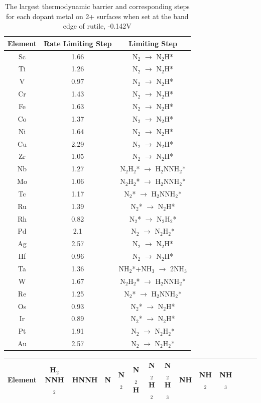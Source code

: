 \documentclass{article}
\begin{document}
\begin{table}
\begin{center}
\begin{tabular}{| c | c |c |}
\hline
Element & Rate Limiting Step & Limiting Step \\
\hline
Sc & 1.66 & N$_2$ $\rightarrow$ N$_2$H*\\
Ti & 1.26 & N$_2$ $\rightarrow$ N$_2$H*\\
V & 0.97 & N$_2$ $\rightarrow$ N$_2$H*\\
Cr & 1.43 & N$_2$ $\rightarrow$ N$_2$H*\\
Fe & 1.63 & N$_2$ $\rightarrow$ N$_2$H*\\
Co & 1.37 & N$_2$ $\rightarrow$ N$_2$H*\\
Ni & 1.64 & N$_2$ $\rightarrow$ N$_2$H*\\
Cu & 2.29 & N$_2$ $\rightarrow$ N$_2$H*\\
Zr & 1.05 & N$_2$ $\rightarrow$ N$_2$H*\\
Nb & 1.27 & N$_2$H$_2$* $\rightarrow$ H$_2$NNH$_2$*\\
Mo & 1.06 & N$_2$H$_2$* $\rightarrow$ H$_2$NNH$_2$*\\
Tc & 1.17 & N$_2$* $\rightarrow$ H$_2$NNH$_2$*\\
Ru & 1.39 & N$_2$* $\rightarrow$ N$_2$H*\\
Rh & 0.82 & N$_2$* $\rightarrow$ N$_2$H$_2$*\\
Pd & 2.1 & N$_2$ $\rightarrow$ N$_2$H$_2$*\\
Ag & 2.57 & N$_2$ $\rightarrow$ N$_2$H*\\
Hf & 0.96 & N$_2$ $\rightarrow$ N$_2$H*\\
Ta & 1.36 & NH$_2$*+NH$_3$ $\rightarrow$ 2NH$_3$\\
W & 1.67 & N$_2$H$_2$* $\rightarrow$ H$_2$NNH$_2$*\\
Re & 1.25 & N$_2$* $\rightarrow$ H$_2$NNH$_2$*\\
Os & 0.93 & N$_2$* $\rightarrow$ N$_2$H*\\
Ir & 0.89 & N$_2$* $\rightarrow$ N$_2$H*\\
Pt & 1.91 & N$_2$ $\rightarrow$ N$_2$H$_2$*\\
Au & 2.57 & N$_2$ $\rightarrow$ N$_2$H$_2$*\\
\hline
\end{tabular}
\end{center}
\caption{The largest thermodynamic barrier and corresponding steps for each dopant metal on 2+ surfaces when set at the band edge of rutile, -0.142V}\label{table:rate_limiting_steps}\end{table}\begin{table}
\setlength\tabcolsep{2pt}
\begin{center}
\begin{tabular}{| c | c | c | c | c | c | c | c | c | c | c | c | c | c |}
\hline
Element & H$_2$NNH$_2$ & HNNH & N & N$_2$ & N$_2$H & N$_2$H$_2$ & N$_2$H$_3$ & NH & NH$_2$ & NH$_3$ & \\
\hline


\end{tabular}
\end{center}
\end{table}
\end{document}
